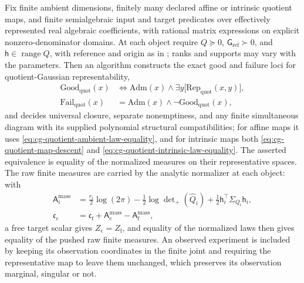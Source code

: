 Fix finite ambient dimensions, finitely many declared affine or intrinsic
quotient maps, and finite semialgebraic input and target predicates over
effectively represented real algebraic coefficients, with rational matrix
expressions on explicit nonzero-denominator domains. At each object require
\(Q\succeq0\), \(\mathsf G_{\mathrm{ref}}\succ0\), and
\(\mathsf h\in\operatorname{range}Q\), with reference and origin as in
; ranks and supports may vary with the
parameters. Then an algorithm constructs the exact good and failure loci for
quotient-Gaussian representability,
\begin{equation}
\begin{aligned}
\mathrm{Good}_{\mathrm{quot}}(x)&\Longleftrightarrow
\mathrm{Adm}(x)\wedge\exists y\bigl[\mathrm{Rep}_{\mathrm{quot}}(x,y)\bigr],\\
\mathrm{Fail}_{\mathrm{quot}}(x)&=\mathrm{Adm}(x)\wedge\neg\mathrm{Good}_{\mathrm{quot}}(x),
\end{aligned}
\label{eq:cg-variable-support-good-locus}
\end{equation}
and decides universal closure, separate nonemptiness, and any finite
simultaneous diagram with its supplied polynomial structural compatibilities;
for affine maps it uses \eqref{eq:cg-quotient-ambient-law-equality}, and for
intrinsic maps both \eqref{eq:cg-quotient-map-descent} and
\eqref{eq:cg-quotient-intrinsic-law-equality}. The asserted equivalence is
equality of the normalized measures on their representative spaces. The raw
finite measures are carried by the analytic normalizer at each object: with
\begin{equation}
\begin{aligned}
\mathsf A_i^{\mathrm{mass}}
&=\frac{r_i}{2}\log(2\pi)
-\frac12\log\det\nolimits_+(\widehat Q_i)
+\frac12\mathsf h_i^\top\Sigma_{Q_i}\mathsf h_i,\\
\mathfrak c_{\mathrm c}
&=\mathfrak c_{\mathrm f}
+\mathsf A_{\mathrm c}^{\mathrm{mass}}
-\mathsf A_{\mathrm f}^{\mathrm{mass}},
\end{aligned}
\label{eq:cg-quotient-raw-scalar}
\end{equation}
a free target scalar gives \(Z_{\mathrm c}=Z_{\mathrm f}\), and equality of the
normalized laws then gives equality of the pushed raw finite measures. An
observed experiment is included by keeping its observation coordinates in the
finite joint and requiring the representative map to leave them unchanged,
which preserves its observation marginal, singular or not.

